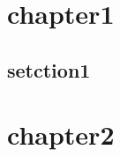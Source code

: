 \documentclass{test}
\begin{document}
\chapter{chapter1}

\section{setction1}

\lipsum[1] \cite{bib-conference}

\lipsum[2] \cite{bib-article}

\chapter{chapter2}

\lipsum[3]



\end{document}
